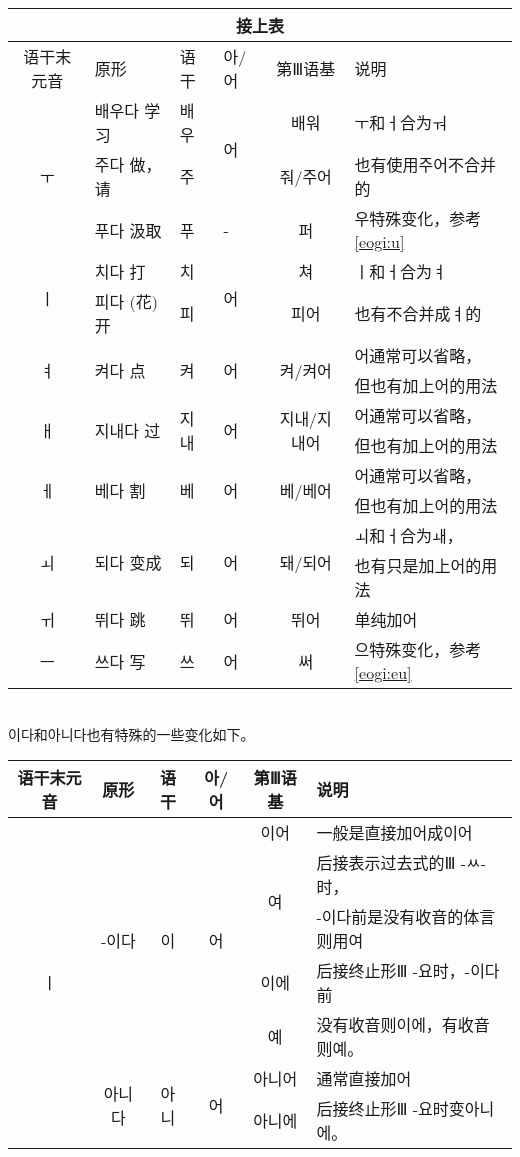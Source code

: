 \begin{tabular}{|c|l|l|l|c|l|}
    \hline
    \multicolumn{6}{|c|}{接上表}\\\hline
    语干末元音&原形&语干&아/어&第Ⅲ语基&说明\\\hline
    \multirow{3}{*}{ㅜ}&배우다 学习&배우&\multirow{2}{*}{어}&배워&ㅜ和ㅓ合为ㅝ\\\cline{2-3}\cline{5-6}
    &주다 做，请&주&&줘/주어&也有使用주어不合并的\\\cline{2-6}
    &푸다 汲取&푸&-&퍼&우特殊变化，参考\ref{eogi:u}\\\hline
    \multirow{2}{*}{ㅣ}&치다 打&치&\multirow{2}{*}{어}&쳐&ㅣ和ㅓ合为ㅕ\\\cline{2-3}\cline{5-6}
    &피다 (花)开&피&&피어&也有不合并成ㅕ的\\\hline
    \multirow{2}{*}{ㅕ}&\multirow{2}{*}{켜다 点}&\multirow{2}{*}{켜}&\multirow{2}{*}{어}&\multirow{2}{*}{켜/켜어}&어通常可以省略，\\
    &&&&&但也有加上어的用法\\\hline
    \multirow{2}{*}{ㅐ}&\multirow{2}{*}{지내다 过}&\multirow{2}{*}{지내}&\multirow{2}{*}{어}&\multirow{2}{*}{지내/지내어}&어通常可以省略，\\
    &&&&&但也有加上어的用法\\\hline
    \multirow{2}{*}{ㅔ}&\multirow{2}{*}{베다 割}&\multirow{2}{*}{베}&\multirow{2}{*}{어}&\multirow{2}{*}{베/베어}&어通常可以省略，\\
    &&&&&但也有加上어的用法\\\hline
    \multirow{2}{*}{ㅚ}&\multirow{2}{*}{되다 变成}&\multirow{2}{*}{되}&\multirow{2}{*}{어}&\multirow{2}{*}{돼/되어}&ㅚ和ㅓ合为ㅙ，\\
    &&&&&也有只是加上어的用法\\\hline
    ㅟ&뛰다 跳&뛰&어&뛰어&单纯加어\\\hline
    ㅡ&쓰다 写&쓰&어&써&으特殊变化，参考\ref{eogi:eu}\\\hline
\end{tabular}\\
이다和아니다也有特殊的一些变化如下。\\
\begin{tabular}{|c|c|c|c|c|l|}
    \hline
    语干末元音&原形&语干&아/어&第Ⅲ语基&说明\\\hline
    \multirow{7}{*}{ㅣ}&\multirow{5}{*}{-이다}&\multirow{5}{*}{이}&\multirow{5}{*}{어}&이어&一般是直接加어成이어\\\cline{5-6}
    &&&&\multirow{2}{*}{여}&后接表示过去式的Ⅲ -ㅆ-时，\\
    &&&&&-이다前是没有收音的体言则用여\\\cline{5-6}
    &&&&이에&后接终止形Ⅲ -요时，-이다前\\\cline{5-5}
    &&&&예&没有收音则이에，有收音则예。\\\cline{2-6}
    &\multirow{2}{*}{아니다}&\multirow{2}{*}{아니}&\multirow{2}{*}{어}&아니어&通常直接加어\\\cline{5-6}
    &&&&아니에&后接终止形Ⅲ -요时变아니에。\\\hline
\end{tabular}\\
